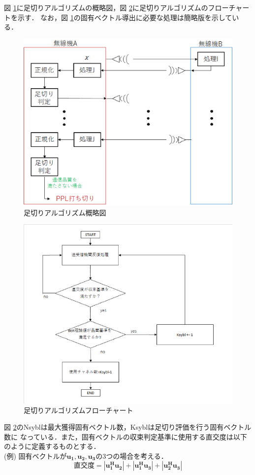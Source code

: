 図 \ref{figCutoff}に足切りアルゴリズムの概略図，図 \ref{figCutoffFlow}に足切りアルゴリズムのフローチャートを示す．
なお，図 \ref{figCutoff}の固有ベクトル導出に必要な処理は簡略版を示している．
\begin{figure}
    \centering
    \includegraphics[width=\linewidth]{chapter4/figure/Cutoff.eps}
    \caption{足切りアルゴリズム概略図}
    \label{figCutoff}
\end{figure}
\begin{figure}
    \centering
    \includegraphics[width=0.95\linewidth]{chapter4/figure/CutoffFlow.eps}
    \caption{足切りアルゴリズムフローチャート}
    \label{figCutoffFlow}
\end{figure}
図 \ref{figCutoffFlow}のNsyblは最大獲得固有ベクトル数，Ksyblは足切り評価を行う固有ベクトル数に
なっている．また，固有ベクトルの収束判定基準に使用する直交度は以下のように定義するものとする．\\
\vspace{5mm}
(例) \quad 固有ベクトルが$\bm{u_1,u_2,u_3}$の3つの場合を考える．
\begin{equation}
    直交度 = \left|\bm{u_1^Hu_2}\right|+\left|\bm{u_1^Hu_3}\right|+\left|\bm{u_2^Hu_3}\right|
\end{equation}

